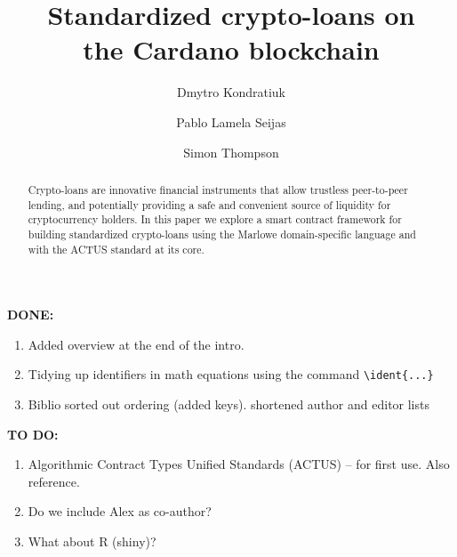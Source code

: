 \documentclass[runningheads]{llncs}
\newcommand{\ident}[1]{\mbox{\emph{#1}}}
\begin{document}
\title{Standardized crypto-loans on\\ the Cardano blockchain}%


\author{Dmytro Kondratiuk \and
				Pablo {Lamela Seijas} \and
                Simon Thompson}





%
\maketitle              %
%
\begin{abstract}
Crypto-loans are %
innovative financial instruments that
allow trustless peer-to-peer %
lending, and potentially providing a safe and convenient
source of liquidity for cryptocurrency holders. In this paper we
explore a smart contract framework for building standardized crypto-loans
using the Marlowe domain-specific language and with the ACTUS standard at its core.

\end{abstract}


\textbf{DONE:}
\begin{enumerate}
\item
Added overview at the end of the intro.
\item
Tidying up identifiers in math equations using the command \verb+\ident{...}+
\item
Biblio sorted out ordering (added keys). shortened author and editor lists
\end{enumerate}

\textbf{TO DO:}
\begin{enumerate}
\item
Algorithmic Contract Types Unified Standards (ACTUS) -- for first use. Also reference.
\item
Do we include Alex as co-author?
\item
What about R (shiny)?
\end{enumerate}
\end{document}
